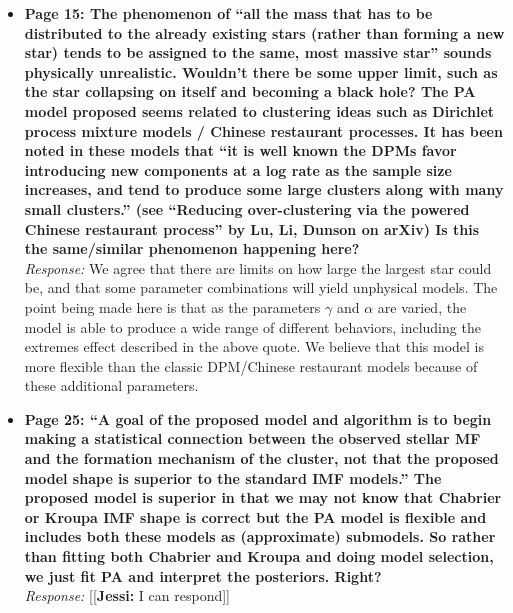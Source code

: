 \documentclass[11pt, oneside]{article}   	%
\newcommand{\jessi}[1]{{\color{blue}[[\textbf{Jessi: }#1]]}}
\begin{document}
\begin{itemize}
\item {\bf Page 15: The phenomenon of ``all the mass that has to be distributed to the already existing stars (rather than forming a new star) tends to be assigned to the same, most massive star'' sounds physically unrealistic. Wouldn't there be some upper limit, such as the star collapsing on itself and becoming a black hole? The PA model proposed seems related to clustering ideas such as Dirichlet process mixture models / Chinese
restaurant processes. It has been noted in these models that ``it is well known the DPMs favor introducing new components at a log rate as the sample size increases, and tend to produce some large clusters along with many small clusters.'' (see ``Reducing over-clustering via the powered Chinese restaurant process'' by Lu, Li, Dunson on arXiv) Is this the same/similar phenomenon happening here?
} \\
\noindent \emph{Response:} We agree that there are limits on how large the largest star could be, and that some parameter combinations will
yield unphysical models. The point being made here is that as the parameters $\gamma$ and $\alpha$ are varied, the model is able to produce
a wide range of different behaviors, including the extremes effect described in the above quote. We believe that this model is more flexible
than the classic DPM/Chinese restaurant models because of these additional parameters.

\bigskip

\item {\bf Page 25: ``A goal of the proposed model and algorithm is to begin making a statistical connection between the observed stellar MF and the formation mechanism of the cluster, not that the proposed model shape is superior to the standard IMF models.'' The proposed model is superior in that we may not know that Chabrier or Kroupa IMF shape is correct but the PA model is flexible and includes both these models as (approximate) submodels. So rather than fitting both Chabrier and Kroupa and doing model selection, we just fit PA and interpret the posteriors. Right?} \\
\noindent \emph{Response:} \jessi{I can respond}
\bigskip
\end{itemize}


\\
\end{document}
